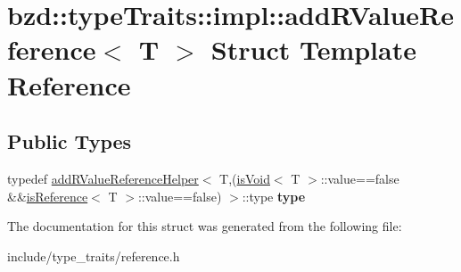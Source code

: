 \hypertarget{structbzd_1_1typeTraits_1_1impl_1_1addRValueReference}{}\section{bzd\+:\+:type\+Traits\+:\+:impl\+:\+:add\+R\+Value\+Reference$<$ T $>$ Struct Template Reference}
\label{structbzd_1_1typeTraits_1_1impl_1_1addRValueReference}
\subsection*{Public Types}
\begin{DoxyCompactItemize}
\item 
\mbox{\label{structbzd_1_1typeTraits_1_1impl_1_1addRValueReference_a7e26f5ffd3507fe5b8e8f463b6e05272}} 
typedef \hyperlink{structbzd_1_1typeTraits_1_1impl_1_1addRValueReferenceHelper}{add\+R\+Value\+Reference\+Helper}$<$ T,(\hyperlink{structbzd_1_1typeTraits_1_1isVoid}{is\+Void}$<$ T $>$\+::value==false \&\&\hyperlink{structbzd_1_1typeTraits_1_1isReference}{is\+Reference}$<$ T $>$\+::value==false) $>$\+::type {\bfseries type}
\end{DoxyCompactItemize}


The documentation for this struct was generated from the following file\+:\begin{DoxyCompactItemize}
\item 
include/type\+\_\+traits/reference.\+h\end{DoxyCompactItemize}
